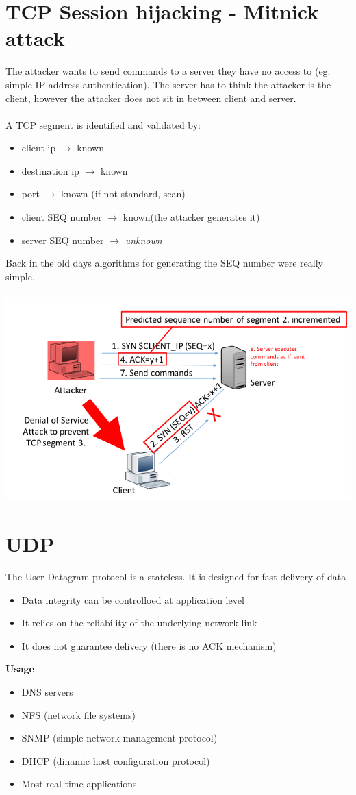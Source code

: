 \documentclass[10pt,a4paper]{book}
\begin{document}
\section{TCP Session hijacking - Mitnick attack}
The attacker wants to send commands to a server they have no access to (eg. simple IP address authentication). The server has to think the attacker is the client, however the attacker does not sit in between client and server.\\\\
A TCP segment is identified and validated by:
\begin{itemize}
\item client ip $\to$ known
\item destination ip $\to$ known
\item port $\to$ known (if not standard, scan)
\item client SEQ number $\to$ known(the attacker generates it)
\item server SEQ number $\to$ \emph{unknown}
\end{itemize}
Back in the old days algorithms for generating the SEQ number were really simple.\\\\
\includegraphics[scale=0.6]{mitnick-attack.png}
\newpage
\section{UDP}
The User Datagram protocol is a stateless. It is designed for fast delivery of data
\begin{itemize}
\item Data integrity can be controlloed at application level
\item It relies on the reliability of the underlying network link
\item It does not guarantee delivery (there is no ACK mechanism)
\end{itemize}
\textbf{Usage}
\begin{itemize}
\item DNS servers
\item NFS (network file systems)
\item SNMP (simple network management protocol)
\item DHCP (dinamic host configuration protocol)
\item Most real time applications
\end{itemize}
\end{document}
